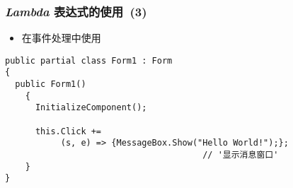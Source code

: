 \begin{frame}[fragile]
\frametitle{\textit{Lambda} 表达式的使用~(3)}
\begin{itemize}
\item 在事件处理中使用
\end{itemize}
\begin{lstlisting}[escapeinside='']
public partial class Form1 : Form
{
  public Form1()
    {
      InitializeComponent();

      this.Click +=
           (s, e) => {MessageBox.Show("Hello World!");};
                                       // '显示消息窗口'
    }
}
\end{lstlisting}
\end{frame}



